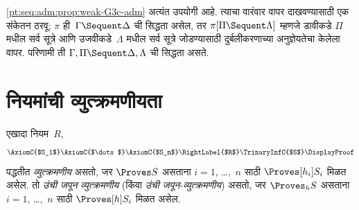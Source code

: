 \ref{pt:seq:adm:prop:weak-G3c-adm} अत्यंत उपयोगी आहे.
त्याचा वारंवार वापर दाखवण्यासाठी एक संकेतन ठरवू:
$\pi$ ही~$\Gamma \Sequent \Delta$ ची सिद्धता
असेल, तर $\pi[\Pi \Sequent \Lambda]$ म्हणजे डावीकडे
$\Pi$ मधील सर्व सूत्रे आणि उजवीकडे~$\Lambda$
मधील सर्व सूत्रे जोडण्यासाठी दुर्बलीकरणाच्या
अनुज्ञेयतेचा केलेला वापर. परिणामी ती $\Gamma, \Pi
\Sequent \Delta, \Lambda$ ची सिद्धता असते.













\section{नियमांची व्युत्क्रमणीयता}\label{pt:seq:inv:sec}

\begin{defn}
एखादा नियम~$R$,
\[
\AxiomC{$S_1$}
\AxiomC{$\dots$}
\AxiomC{$S_n$}
\RightLabel{$R$}
\TrinaryInfC{$S$}
\DisplayProof
\]
पद्धतीत \emph{व्युत्क्रमणीय} असतो, जर $\Proves S$
असताना $i = 1$, \dots,~$n$ साठी $\Proves[h_i] S_i$
मिळत असेल. तो \emph{उंची जपून व्युत्क्रमणीय}
(किंवा \emph{उंची जपून-व्युत्क्रमणीय}) असतो, जर
$\Proves_h S$ असताना $i = 1$, \dots,~$n$
साठी $\Proves[h] S_i$ मिळत असेल.
\end{defn}

